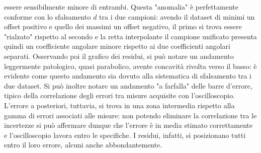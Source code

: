 \documentclass[a4paper,11pt]{article} %
\begin{document}
essere sensibilmente minore di entrambi. Questa "anomalia" è perfettamente conforme con lo sfalsamento $d$ tra i due
campioni: avendo il dataset di minimi un offset positivo e quello dei massimi un offset negativo, il primo si trova
essere "rialzato" rispetto al secondo e la retta interpolante il campione unificato presenta quindi un coefficiente
angolare minore rispetto ai due coefficienti angolari separati. Osservando poi il grafico dei residui, si può notare un
andamento leggermente patologico, quasi parabolico, avente concavità rivolta verso il basso: è evidente come questo
andamento sia dovuto alla sistematica di sfalsamento tra i due dataset. Si può inoltre notare un andamento "a farfalla"
delle barre d'errore, tipico della correlazione degli errori tra misure acquisite con l'oscilloscopio. L'errore a
posteriori, tuttavia, si trova in una zona intermedia rispetto alla gamma di errori associati alle misure: non potendo
eliminare la correlazione tra le incertezze si può affermare dunque che l'errore è in media stimato correttamente e
l'oscilloscopio lavora entro le specifiche. I residui, infatti, si posizionano tutti entro il loro errore, alcuni anche
abbondantemente.\\
\end{document}
